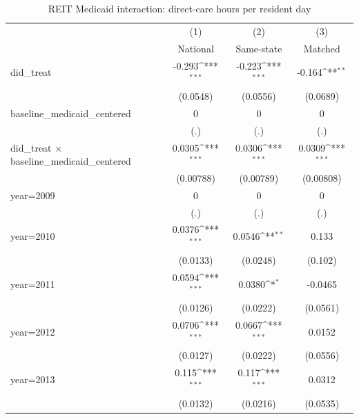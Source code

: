 \begin{table}[htbp]\centering
\def\sym#1{\ifmmode^{#1}\else\(^{#1}\)\fi}
\caption{REIT Medicaid interaction: direct-care hours per resident day}
\begin{tabular}{l*{3}{c}}
\hline\hline
                    &\multicolumn{1}{c}{(1)}&\multicolumn{1}{c}{(2)}&\multicolumn{1}{c}{(3)}\\
                    &\multicolumn{1}{c}{National}&\multicolumn{1}{c}{Same-state}&\multicolumn{1}{c}{Matched}\\
\hline
did\_treat           &      -0.293\sym{***}&      -0.223\sym{***}&      -0.164\sym{**} \\
                    &    (0.0548)         &    (0.0556)         &    (0.0689)         \\
[1em]
baseline\_medicaid\_centered&           0         &           0         &           0         \\
                    &         (.)         &         (.)         &         (.)         \\
[1em]
did\_treat $\times$ baseline\_medicaid\_centered&      0.0305\sym{***}&      0.0306\sym{***}&      0.0309\sym{***}\\
                    &   (0.00788)         &   (0.00789)         &   (0.00808)         \\
[1em]
year=2009           &           0         &           0         &           0         \\
                    &         (.)         &         (.)         &         (.)         \\
[1em]
year=2010           &      0.0376\sym{***}&      0.0546\sym{**} &       0.133         \\
                    &    (0.0133)         &    (0.0248)         &     (0.102)         \\
[1em]
year=2011           &      0.0594\sym{***}&      0.0380\sym{*}  &     -0.0465         \\
                    &    (0.0126)         &    (0.0222)         &    (0.0561)         \\
[1em]
year=2012           &      0.0706\sym{***}&      0.0667\sym{***}&      0.0152         \\
                    &    (0.0127)         &    (0.0222)         &    (0.0556)         \\
[1em]
year=2013           &       0.115\sym{***}&       0.117\sym{***}&      0.0312         \\
                    &    (0.0132)         &    (0.0216)         &    (0.0535)         \\

\end{tabular}
\end{table}
